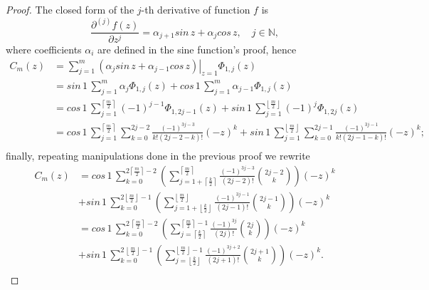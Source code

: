 \begin{proof}
The closed form of the $j$-th derivative of function $f$ is
$$\frac{\partial^{(j)}{f}(z)}{\partial{z}^{j}} = \alpha_{j+1}sin\,{z} +
\alpha_{j}cos\,{z}, \quad j\in\mathbb{N},$$ where coefficients $\alpha_{i}$
are defined in the sine function's proof, hence 
\begin{displaymath}
\begin{split}
  C_{m}(z) &= \sum_{j=1}^{m}{ \left. \left(\alpha_{j}sin\,{z} + \alpha_{j-1}cos\,{z}\right) \right|_{z=1}\Phi_{1,j}(z)} \\
       &= sin\,{1}\,\sum_{j=1}^{m}{ \alpha_{j}\Phi_{1,j}(z)} + cos\,{1}\,\sum_{j=1}^{m}{ \alpha_{j-1}\Phi_{1,j}(z)} \\
       &= cos\,{1}\,\sum_{j=1}^{\left\lceil \frac{m}{2} \right\rceil}{ (-1)^{j-1}\Phi_{1,2j-1}(z)} 
        + sin\,{1}\,\sum_{j=1}^{\left\lfloor \frac{m}{2} \right\rfloor}{ (-1)^{j}\Phi_{1,2j}(z)} \\
       &= cos\,{1}\,\sum_{j=1}^{\left\lceil \frac{m}{2} \right\rceil}{\sum_{k=0}^{2j-2}{ \frac{(-1)^{3j-3}}{k!(2j-2-k)!}{(-z)^{k}}} }
       + sin\,{1}\,\sum_{j=1}^{\left\lfloor \frac{m}{2} \right\rfloor}{\sum_{k=0}^{2j-1}{ \frac{(-1)^{3j-1}}{k!(2j-1-k)!}{(-z)^{k}}}}; \\
\end{split}
\end{displaymath}
finally, repeating manipulations done in the previous proof we rewrite
\begin{displaymath}
\begin{split}
  C_{m}(z)  &= cos\,{1}\,\sum_{k=0}^{2 \left\lceil \frac{m}{2} \right\rceil-2}{\left(\sum_{j=1+\left\lceil \frac{k}{2}\right\rceil}^{\left\lceil \frac{m}{2} \right\rceil}{\frac{(-1)^{3j-3}}{(2j-2)!}{2j-2\choose k}}\right) {(-z)^{k}}}\\
            &+ sin\,{1}\,\sum_{k=0}^{2 \left\lfloor \frac{m}{2} \right\rfloor-1}{\left(\sum_{j=1+\left\lfloor \frac{k}{2}\right\rfloor}^{\left\lfloor \frac{m}{2} \right\rfloor}{ \frac{(-1)^{3j-1}}{(2j-1)!} {2j-1\choose k}}\right){(-z)^{k}}} \\
            &= cos\,{1}\,\sum_{k=0}^{2\,\left\lceil \frac{m}{2} \right\rceil-2}{\left(\sum_{j=\left\lceil \frac{k}{2}\right\rceil}^{\left\lceil \frac{m}{2} \right\rceil -1}{\frac{(-1)^{3j}}{(2j)!}{2j\choose k}}\right) {(-z)^{k}}}\\
            &+ sin\,{1}\,\sum_{k=0}^{2\,\left\lfloor \frac{m}{2} \right\rfloor-1}{\left(\sum_{j=\left\lfloor \frac{k}{2}\right\rfloor}^{\left\lfloor \frac{m}{2} \right\rfloor -1}{\frac{(-1)^{3j+2}}{(2j + 1)!} {2j+1\choose k}}\right){(-z)^{k}}}. \\
\end{split}
\end{displaymath}
\end{proof}

